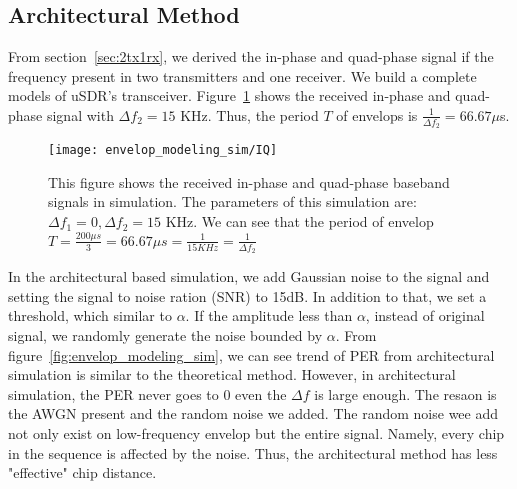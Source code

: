 \subsection{Architectural Method}
From section~\ref{sec:2tx1rx}, we derived the in-phase and quad-phase signal if the frequency present
in two transmitters and one receiver. We build a complete models of uSDR's transceiver. 
Figure~\ref{fig:envelop_modeling_sim_IQ} shows the received in-phase and quad-phase signal with 
$\Delta f_2 = 15$ KHz. Thus, the period $T$ of envelops is $\tfrac{1}{\Delta f_2} = 66.67 \mu$s. 
\begin{figure}[h]
\centering
	\texttt{[image: envelop\_modeling\_sim/IQ]}
	\caption{This figure shows the received in-phase and quad-phase baseband signals in simulation. The 
	parameters of this simulation are: $\Delta f_1 = 0, \Delta f_2 = 15$ KHz. We can see that the period
	of envelop $T = \tfrac{200 \mu s}{3} = 66.67 \mu s = \tfrac{1}{15 KHz} = \tfrac{1}{\Delta f_2}$}
	\label{fig:envelop_modeling_sim_IQ}
\end{figure}

In the architectural based simulation, we add Gaussian noise to the signal and setting the signal to noise
ration (SNR) to 15dB. In addition to that, we set a threshold, which similar to $\alpha$. If the amplitude
less than $\alpha$, instead of original signal, we randomly generate the noise bounded by $\alpha$. 
From figure~\ref{fig:envelop_modeling_sim}, we can see trend of PER from architectural simulation is similar
to the theoretical method. However, in architectural simulation, the PER never goes to 0 even the $\Delta f$
is large enough. The resaon is the AWGN present and the random noise we added. The random noise wee add not
only exist on low-frequency envelop but the entire signal. Namely, every chip in the sequence is affected by
the noise. Thus, the architectural method has less "effective" chip distance.

